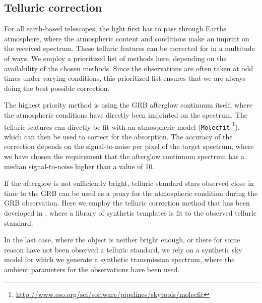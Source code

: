 \documentclass{aa}    %
\begin{document}
\subsection{Telluric correction} \label{tell_corr}

For all earth-based telescopes, the light first has to pass through Earths
atmosphere, where the atmospheric content and conditions make an imprint on the
received spectrum. These telluric features can be corrected for in a multitude
of ways. We employ a prioritized list of methods here, depending on the
availability of the chosen methods. Since the observations are often taken at
odd times under varying conditions, this prioritized list ensures that we are
always doing the best possible correction.

The highest priority method is using the GRB afterglow continuum itself, where
the atmospheric conditions have directly been imprinted on the spectrum. The
telluric features can directly be fit with an atmospheric model
(\texttt{Molecfit} \citep{Smette2015,
	Kausch2015}\footnote{\url{http://www.eso.org/sci/software/pipelines/skytools/molecfit}}), which can then be used to correct for the absorption. The accuracy of the correction depends on the signal-to-noise per pixel of the target spectrum, where we have chosen the requirement that the afterglow continuum spectrum has a median signal-to-noise higher than a value of 10.

If the afterglow is not sufficiently bright, telluric standard stars observed
close in time to the GRB can be used as a proxy for the atmospheric
condition during the GRB observation. Here we employ the telluric correction
method that has been developed in \citet{Selsing2015}, where a library of
synthetic templates is fit to the observed telluric standard.

In the last case, where the object is neither bright enough, or there for some
reason have not been observed a telluric standard, we rely on a synthetic sky
model \citep{Noll2012, Jones2013} for which we generate a
synthetic transmission spectrum, where the ambient parameters for the
observations have been used.
\end{document}

